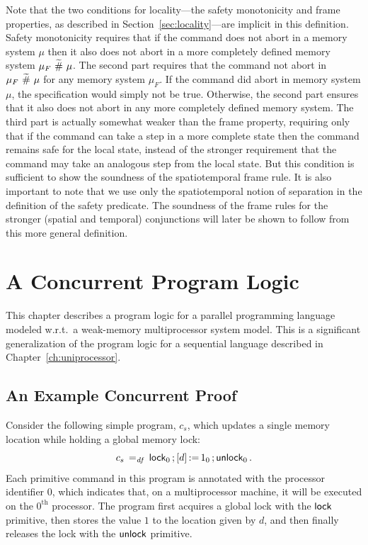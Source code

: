 \documentclass[11pt]{report}         %
\begin{document}
Note that the two conditions for locality---the safety monotonicity and frame properties, as described in Section~\ref{sec:locality}---are implicit in this definition. Safety monotonicity requires that if the command does not abort in a memory system $\mu$ then it also does not abort in a more completely defined memory system $\mu_F \operatorname{\,\widetilde{\#}\,} \mu$. The second part requires that the command not abort in $\mu_F \operatorname{\,\widetilde{\#}\,} \mu$ for any memory system $\mu_F$. If the command did abort in memory system $\mu$, the specification would simply not be true. Otherwise, the second part ensures that it also does not abort in any more completely defined memory system. The third part is actually somewhat weaker than the frame property, requiring only that if the command can take a step in a more complete state then the command remains safe for the local state, instead of the stronger requirement that the command may take an analogous step from the local state. But this condition is sufficient to show the soundness of the spatiotemporal frame rule. It is also important to note that we use only the spatiotemporal notion of separation in the definition of the safety predicate. The soundness of the frame rules for the stronger (spatial and temporal) conjunctions will later be shown to follow from this more general definition.

\chapter{A Concurrent Program Logic}
\label{ch:multiprocessor}

This chapter describes a program logic for a parallel programming language modeled w.r.t.\ a weak-memory multiprocessor system model. This is a significant generalization of the program logic for a sequential language described in Chapter~\ref{ch:uniprocessor}. 

\section{An Example Concurrent Proof}
\label{sec:concurrent-example}

Consider the following simple program, $c_s$, which updates a single memory location while holding a global memory lock: \[ c_s \operatorname{\;=_{\mathit{df}}\;} \operatorname{\mathsf{lock}}_0 \operatorname{;} \left[ d \right] \operatorname{:\!=} 1_0 \operatorname{;} \operatorname{\mathsf{unlock}}_0. \] Each primitive command in this program is annotated with the processor identifier $0$, which indicates that, on a multiprocessor machine, it will be executed on the $0^{\mathrm{th}}$ processor. The program first acquires a global lock with the $\operatorname{\mathsf{lock}}$
 primitive, then stores the value $1$ to the location given by $d$, and then finally releases the lock with the $\operatorname{\mathsf{unlock}}$ primitive. 
\end{document}
